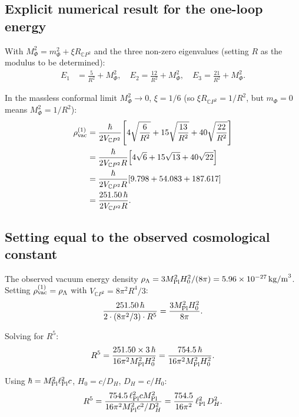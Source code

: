 \documentclass[11pt]{article}
\newcommand{\ee}[1]{\times 10^{#1}}
\newcommand{\CP}{\mathbb{C}P^2}
\newcommand{\Mpl}{M_{\rm Pl}}
\newcommand{\Hzero}{H_0}
\begin{document}
\subsection{Explicit numerical result for the one-loop energy}

With $M_\Phi^2 = m_\Phi^2 + \xi R_{\CP}$ and the three non-zero eigenvalues
(setting $R$ as the modulus to be determined):
\begin{align}
  E_1 &= \frac{5}{R^2} + M_\Phi^2, \quad
  E_2 = \frac{12}{R^2} + M_\Phi^2, \quad
  E_3 = \frac{21}{R^2} + M_\Phi^2.
\end{align}

In the massless conformal limit $M_\Phi^2 \to 0$, $\xi = 1/6$ (so
$\xi R_{\CP} = 1/R^2$, but $m_\Phi = 0$ means $M_\Phi^2 = 1/R^2$):
\begin{align}
  \rho_{\rm vac}^{(1)} &= \frac{\hbar}{2V_{\CP}}\!\left[
    4\sqrt{\frac{6}{R^2}} + 15\sqrt{\frac{13}{R^2}} + 40\sqrt{\frac{22}{R^2}}
  \right] \nonumber\\
  &= \frac{\hbar}{2V_{\CP} R}\!\left[
    4\sqrt{6} + 15\sqrt{13} + 40\sqrt{22}
  \right] \nonumber\\
  &= \frac{\hbar}{2V_{\CP} R}\!\left[9.798 + 54.083 + 187.617\right] \nonumber\\
  &= \frac{251.50\,\hbar}{2V_{\CP} R}.
\end{align}

\subsection{Setting equal to the observed cosmological constant}

The observed vacuum energy density $\rho_\Lambda = 3\Mpl^2\Hzero^2/(8\pi)
= 5.96\ee{-27}\,{\rm kg/m}^3$.  Setting $\rho_{\rm vac}^{(1)} = \rho_\Lambda$
with $V_{\CP} = 8\pi^2 R^4/3$:
\begin{equation}
  \frac{251.50\,\hbar}{2\cdot(8\pi^2/3)\cdot R^5}
  = \frac{3\Mpl^2\Hzero^2}{8\pi}.
\end{equation}

Solving for $R^5$:
\begin{equation}
  R^5 = \frac{251.50\times 3\,\hbar}{16\pi^2\Mpl^2\Hzero^2}
       = \frac{754.5\,\hbar}{16\pi^2\Mpl^2\Hzero^2}.
\end{equation}

Using $\hbar = \Mpl^2\ell_{\rm Pl}^2 c$, $\Hzero = c/D_H$, $D_H = c/\Hzero$:
\begin{equation}
  R^5 = \frac{754.5\,\ell_{\rm Pl}^2 c\Mpl^2}{16\pi^2\Mpl^2 c^2/D_H^2}
  = \frac{754.5}{16\pi^2}\,\ell_{\rm Pl}^2\,D_H^2.
\end{equation}
\end{document}
